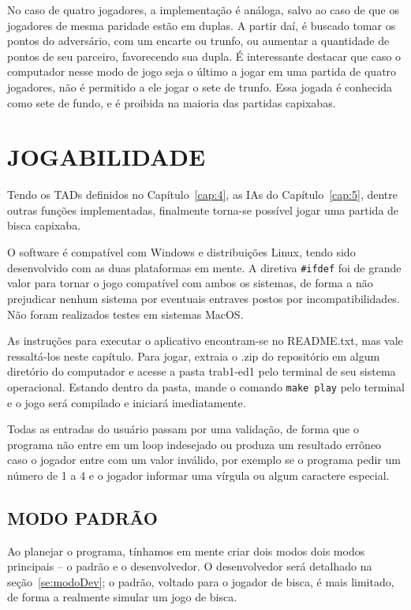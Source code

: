 \documentclass[12pt, oneside, a4paper, brazil]{abntex2}
\begin{document}
No caso de quatro jogadores, a implementação é análoga, salvo ao caso de que os jogadores de mesma paridade estão em duplas. A partir daí, é buscado tomar os pontos do adversário, com um encarte ou trunfo, ou aumentar a quantidade de pontos de seu parceiro, favorecendo sua dupla. É interessante destacar que caso o computador nesse modo de jogo seja o último a jogar em uma partida de quatro jogadores, não é permitido a ele jogar o sete de trunfo. Essa jogada é conhecida como sete de fundo, e é proibida na maioria das partidas capixabas.

\chapter{JOGABILIDADE}\label{cap:6}
Tendo os TADs definidos no Capítulo~\ref{cap:4}, as IAs do Capítulo~\ref{cap:5}, dentre outras funções implementadas, finalmente torna-se possível jogar uma partida de bisca capixaba.

O software é compatível com Windows e distribuições Linux, tendo sido desenvolvido com as duas plataformas em mente. A diretiva \texttt{\#ifdef} foi de grande valor para tornar o jogo compatível com ambos os sistemas, de forma a não prejudicar nenhum sistema por eventuais entraves postos por incompatibilidades. Não foram realizados testes em sistemas MacOS.

As instruções para executar o aplicativo encontram-se no README.txt, mas vale ressaltá-los neste capítulo. Para jogar, extraia o .zip do repositório em algum diretório do computador e acesse a pasta trab1-ed1 pelo terminal de seu sistema operacional. Estando dentro da pasta, mande o comando \texttt{make play} pelo terminal e o jogo será compilado e iniciará imediatamente.\footnotemark


Todas as entradas do usuário passam por uma validação, de forma que o programa não entre em um loop indesejado ou produza um resultado errôneo caso o jogador entre com um valor inválido, por exemplo se o programa pedir um número de 1 a 4 e o jogador informar uma vírgula ou algum caractere especial.

\section{MODO PADRÃO}
Ao planejar o programa, tínhamos em mente criar dois modos dois modos principais -- o padrão e o desenvolvedor. O desenvolvedor será detalhado na seção~\ref{se:modoDev}; o padrão, voltado para o jogador de bisca, é mais limitado, de forma a realmente simular um jogo de bisca.
\end{document}
